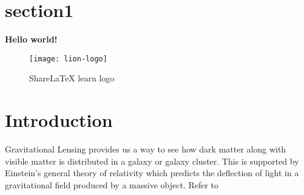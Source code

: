 \documentclass[../main.tex]{subfiles}
\begin{document}
\section{section1}
\textbf{Hello world!}

\begin{figure}[bh]
\centering
\texttt{[image: lion-logo]}

\label{fig:img1}
\caption{ShareLaTeX learn logo}
\end{figure}


\section{Introduction}\label{sec:intro}
Gravitational Lensing provides us a way
to see how dark matter along with visible matter is distributed
in a galaxy or galaxy cluster.
This is supported by Einstein's general theory of relativity
which predicts the deflection of light in a gravitational field
produced by a massive object. Refer to \cite{fabian12}
\end{document}
